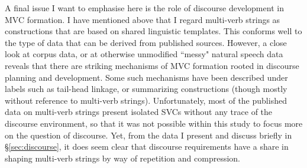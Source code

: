 \largerpage
A final issue I want to emphasise here is the role of discourse development in MVC formation. I have mentioned above that I regard multi-verb strings as constructions that are based on shared linguistic templates. This conforms well to the type of data that can be derived from published sources. However, a close look at corpus data, or at otherwise unmodified ``messy" natural speech data reveals that there are striking mechanisms of MVC formation rooted in discourse planning and development. Some such mechanisms have been described under labels such as tail-head linkage, or summarizing constructions (though mostly without  reference to multi-verb strings). Unfortunately, most of the published data on multi-verb strings present isolated SVCs without any trace of the discourse environment, so that it was not possible within this study to focus more on the question of discourse. Yet, from the data I present and discuss briefly in §\ref{sec:discourse}, it does seem clear that discourse requirements have a share in shaping multi-verb strings by way of repetition and compression.
